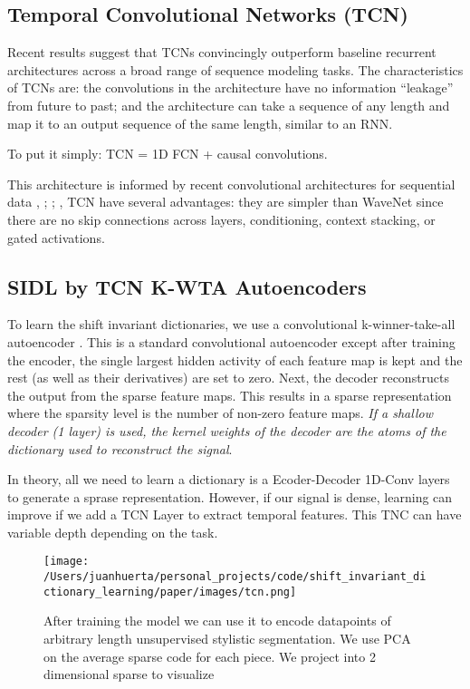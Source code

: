 \documentclass[11pt,a4paper]{article}
\begin{document}
\subsection{Temporal Convolutional Networks (TCN) }

Recent results suggest that TCNs convincingly outperform
baseline recurrent architectures across a broad range of sequence modeling tasks. The characteristics of TCNs are: the convolutions in the architecture have no information “leakage” from future to past; and the architecture can take a sequence of any length and map it to
an output sequence of the same length, similar to an RNN.

To put it simply: TCN = 1D FCN + causal convolutions.

This architecture is informed by recent convolutional architectures for sequential data \cite{oord2016wavenet},
\cite{kalchbrenner2017neural} ; \cite{DBLP:journals/corr/DauphinFAG16}; \cite{Zheng2016}, TCN have several advantages: they are simpler than WaveNet \cite{oord2016wavenet} since there are no skip connections across layers, conditioning, context stacking, or gated activations.


\subsection{SIDL by TCN K-WTA Autoencoders}
To learn the shift invariant dictionaries, we use a convolutional k-winner-take-all autoencoder \cite{DBLP:journals/corr/MakhzaniF14}. This is a standard convolutional autoencoder except after training the encoder, the single largest hidden activity of each feature map is kept and the rest (as well as their derivatives) are set to zero. Next, the decoder reconstructs the output from the sparse feature maps. This results in a sparse representation where the sparsity level is the number of non-zero feature maps. \emph{If a shallow decoder (1 layer) is used, the kernel weights of the decoder are the atoms of the dictionary used to reconstruct the signal}. 

In theory, all we need to learn a dictionary is a Ecoder-Decoder 1D-Conv layers to generate a sprase representation. However, if our signal is dense, learning can improve if we add a TCN Layer to extract temporal features. This TNC can have variable depth depending on the task.

\begin{figure}[ht]
  \texttt{[image: /Users/juanhuerta/personal\_projects/code/shift\_invariant\_dictionary\_learning/paper/images/tcn.png]}
  \caption{After training the model we can use it to encode datapoints of arbitrary length unsupervised stylistic segmentation. We use PCA on the average sparse code for each piece. We project into 2 dimensional sparse to visualize }
  \label{fig:boat1}
\end{figure}
\end{document}
